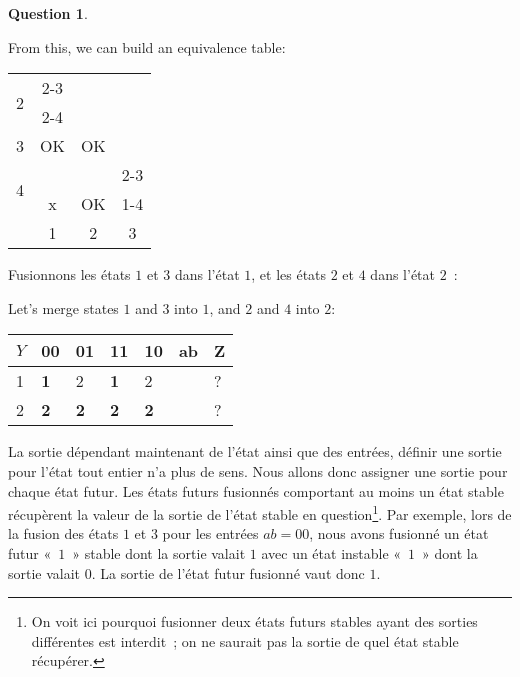 \documentclass[11pt,a4paper,dvipsnames]{article}
\theoremstyle{definition}%
\newtheorem{Q}{Question}[] %
\newcommand{\fr}[1]{
 	\ifthenelse {\boolean{fr}} {#1} {}
 }
\newcommand{\en}[1]{
 	\ifthenelse {\boolean{en}} {#1} {}
 }
\begin{document}
\begin{Q}
{\begin{enumerate}
{		From this, we can build an equivalence table:}
		\begin{center}
			\begin{tabular}{cccc} \cline{1-2}
				\multicolumn{1}{|c|}{\multirow{2}{*}{2}}	&	\multicolumn{1}{c|}{\cellcolor{green!25}2-3} 					& 																	& \\
				\multicolumn{1}{|c|}{}						&	\multicolumn{1}{c|}{\cellcolor{green!25}2-4}					& 																	& \\ \cline{1-3}
				\multicolumn{1}{|c|}{3}	& 						\multicolumn{1}{c|}{\cellcolor{green!25}OK}						& \multicolumn{1}{c|}{\cellcolor{green!25} OK}						& \\ \cline{1-4}
				\multicolumn{1}{|c|}{\multirow{2}{*}{4}} & 		\multicolumn{1}{c|}{\cellcolor{red!25}}							& \multicolumn{1}{|c|}{\cellcolor{green!25}} 						& \multicolumn{1}{c|}{\cellcolor{red!25}2-3}\\
				\multicolumn{1}{|c|}{} & 						\multicolumn{1}{c|}{\multirow{-2}{*}{\cellcolor{red!25}x}} 	& \multicolumn{1}{|c|}{\multirow{-2}{*}{\cellcolor{green!25}OK}} 	& \multicolumn{1}{c|}{\cellcolor{red!25}1-4} \\ \cline{1-4}
			 & 													\multicolumn{1}{|c|}{1} & 										\multicolumn{1}{c|}{2} 											& \multicolumn{1}{c|}{3} \\ \cline{2-4}
			\end{tabular}
		\end{center}

		\fr{Fusionnons les états $1$ et $3$ dans l'état $1$, et les états $2$ et $4$ dans l'état $2$~:}
		\en{Let's merge states $1$ and $3$ into $1$, and $2$ and $4$ into $2$:}
		\begin{center}
		\begin{tabular}{|l|l|l|l|l|l|l|}
		\hline
		$Y$ & 00         & 01         & 11         & 10         & ab & Z \\ \hline
		1           & \textbf{1} & 2          & \textbf{1}          & 2          &    & ? \\ \cline{1-5} \cline{7-7}
		2           & \textbf{2}          & \textbf{2} & \textbf{2} & \textbf{2} &    & ? \\ \cline{1-5} \cline{7-7}
		\end{tabular}
		\end{center}

		\fr{La sortie dépendant maintenant de l'état ainsi que des entrées, définir une sortie pour l'état tout entier n'a plus de sens.
		Nous allons donc assigner une sortie pour chaque état futur.
		Les états futurs fusionnés comportant au moins un état stable récupèrent la valeur de la sortie de l'état stable en question\footnote{On voit ici pourquoi fusionner deux états futurs stables ayant des sorties différentes est interdit~; on ne saurait pas la sortie de quel état stable récupérer.}.
		Par exemple, lors de la fusion des états $1$ et $3$ pour les entrées $ab = 00$, nous avons fusionné un état futur «~$1$~» stable dont la sortie valait $1$ avec un état instable «~$1$~» dont la sortie valait $0$.
		La sortie de l'état futur fusionné vaut donc $1$.

}
\end{enumerate}}
\end{Q}
\end{document}

